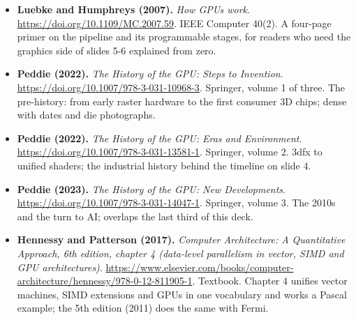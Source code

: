 \begin{itemize}[leftmargin=1.2em,itemsep=3pt]
\item \textbf{Luebke and Humphreys (2007).} \textit{How GPUs work}. \url{https://doi.org/10.1109/MC.2007.59}. IEEE Computer 40(2). A four-page primer on the pipeline and its programmable stages, for readers who need the graphics side of slides 5-6 explained from zero.
\item \textbf{Peddie (2022).} \textit{The History of the GPU: Steps to Invention}. \url{https://doi.org/10.1007/978-3-031-10968-3}. Springer, volume 1 of three. The pre-history: from early raster hardware to the first consumer 3D chips; dense with dates and die photographs.
\item \textbf{Peddie (2022).} \textit{The History of the GPU: Eras and Environment}. \url{https://doi.org/10.1007/978-3-031-13581-1}. Springer, volume 2. 3dfx to unified shaders; the industrial history behind the timeline on slide 4.
\item \textbf{Peddie (2023).} \textit{The History of the GPU: New Developments}. \url{https://doi.org/10.1007/978-3-031-14047-1}. Springer, volume 3. The 2010s and the turn to AI; overlaps the last third of this deck.
\item \textbf{Hennessy and Patterson (2017).} \textit{Computer Architecture: A Quantitative Approach, 6th edition, chapter 4 (data-level parallelism in vector, SIMD and GPU architectures)}. \url{https://www.elsevier.com/books/computer-architecture/hennessy/978-0-12-811905-1}. Textbook. Chapter 4 unifies vector machines, SIMD extensions and GPUs in one vocabulary and works a Pascal example; the 5th edition (2011) does the same with Fermi.
\end{itemize}

